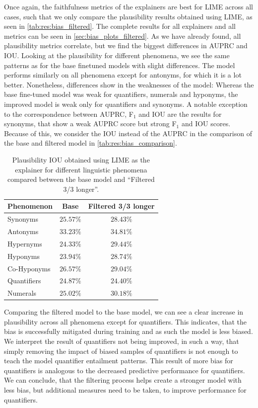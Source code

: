 Once again, the faithfulness metrics of the explainers are best for \ac{LIME} across all cases, such that we only compare the plausibility results obtained using \ac{LIME}, as seen in \autoref{tab:res:bias_filtered}. The complete results for all explainers and all metrics can be seen in \autoref{sec:bias_plots_filtered}. As we have already found, all plausibility metrics correlate, but we find the biggest differences in \acs{AUPRC} and \acs{IOU}. Looking at the plausibility for different phenomena, we see the same patterns as for the base finetuned models with slight differences. The model performs similarly on all phenomena except for antonyms, for which it is a lot better. Nonetheless, differences show in the weaknesses of the model: Whereas the base fine-tuned model was weak for quantifiers, numerals and hyponyms, the improved model is weak only for quantifiers and synonyms. A notable exception to the correspondence between \acs{AUPRC}, F$_1$ and \acs{IOU} are the results for synonyms, that show a weak \acs{AUPRC} score but strong F$_1$ and \acs{IOU} scores. Because of this, we consider the \acs{IOU} instead of the \acs{AUPRC} in the comparison of the base and filtered model in \autoref{tab:res:bias_comparison}.

\begin{table}[ht!]
    \centering
    \caption{Plausibility \acs{IOU} obtained using \ac{LIME} as the explainer for different linguistic phenomena compared between the base model and \enquote{Filtered 3/3 longer}.}
    \begin{tabular}{l c c}
        \toprule
        \multicolumn{1}{c}{Phenomenon} & Base & Filtered 3/3 longer \\
        \midrule
        Synonyms & $25.57\%$ & $28.43\%$ \\
        Antonyms & $33.23\%$ & $34.81\%$ \\
        Hypernyms & $24.33\%$ & $29.44\%$ \\
        Hyponyms & $23.94\%$ & $28.74\%$ \\
        Co-Hyponyms & $26.57\%$ & $29.04\%$ \\
        Quantifiers & $24.87\%$ & $24.40\%$ \\
        Numerals & $25.02\%$ & $30.18\%$ \\
        \bottomrule
    \end{tabular}
    \label{tab:res:bias_comparison}
\end{table}

Comparing the filtered model to the base model, we can see a clear increase in plausibility across all phenomena except for quantifiers. This indicates, that the bias is successfully mitigated during training and as such the model is less biased. We interpret the result of quantifiers not being improved, in such a way, that simply removing the impact of biased samples of quantifiers is not enough to teach the model quantifier entailment patterns. This result of more bias for quantifiers is analogous to the decreased predictive performance for quantifiers. We can conclude, that the filtering process helps create a stronger model with less bias, but additional measures need to be taken, to improve performance for quantifiers.

